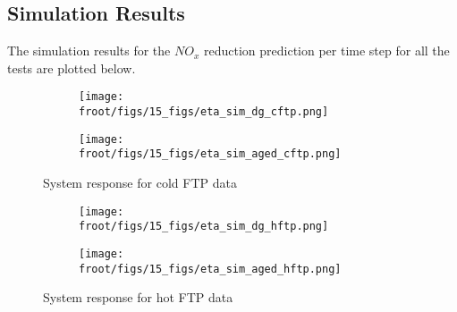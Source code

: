 \subsection{Simulation Results}
The simulation results for the $NO_x$ reduction prediction per time step for all the tests are plotted below.

\begin{figure}[H]
        \begin{minipage}{0.49\textwidth}
                \begin{figure}[H]
                        \centering
                        \texttt{[image: \\froot/figs/15\_figs/eta\_sim\_dg\_cftp.png]}
                \end{figure}
        \end{minipage}
        \begin{minipage}{0.49\textwidth}
                \begin{figure}[H]
                        \centering
                        \texttt{[image: \\froot/figs/15\_figs/eta\_sim\_aged\_cftp.png]}
                \end{figure}
        \end{minipage}
        \caption{System response for cold FTP data}
\end{figure}

\begin{figure}[H]
        \begin{minipage}{0.49\textwidth}
                \begin{figure}[H]
                        \centering
                        \texttt{[image: \\froot/figs/15\_figs/eta\_sim\_dg\_hftp.png]}
                \end{figure}
        \end{minipage}
        \begin{minipage}{0.49\textwidth}
                \begin{figure}[H]
                        \centering
                        \texttt{[image: \\froot/figs/15\_figs/eta\_sim\_aged\_hftp.png]}
                \end{figure}
        \end{minipage}
        \caption{System response for hot FTP data}
\end{figure}

